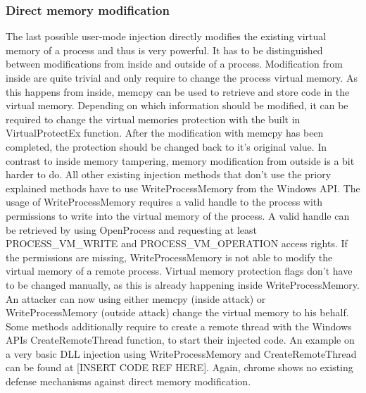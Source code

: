 \subsubsection{Direct memory modification}
The last possible user-mode injection directly modifies the existing virtual memory of a process and thus is very powerful. It has to be distinguished between modifications from inside and outside of a process. Modification from inside are quite trivial and only require to change the process virtual memory. As this happens from inside, memcpy can be used to retrieve and store code in the virtual memory. Depending on which information should be modified, it can be required to change the virtual memories protection with the built in VirtualProtectEx function. After the modification with memcpy has been completed, the protection should be changed back to it's original value. In contrast to inside memory tampering, memory modification from outside is a bit harder to do. All other existing injection methods that don't use the priory explained methods have to use WriteProcessMemory from the Windows API. The usage of WriteProcessMemory requires a valid handle to the process with permissions to write into the virtual memory of the process. A valid handle can be retrieved by using OpenProcess and requesting at least PROCESS\_VM\_WRITE and PROCESS\_VM\_OPERATION access rights. If the permissions are missing, WriteProcessMemory is not able to modify the virtual memory of a remote process. Virtual memory protection flags don't have to be changed manually, as this is already happening inside WriteProcessMemory. An attacker can now using either memcpy (inside attack) or WriteProcessMemory (outside attack) change the virtual memory to his behalf. Some methods additionally require to create a remote thread with the Windows APIs CreateRemoteThread function, to start their injected code. An example on a very basic DLL injection using WriteProcessMemory and CreateRemoteThread can be found at [INSERT CODE REF HERE]. Again, chrome shows no existing defense mechanisms against direct memory modification.
